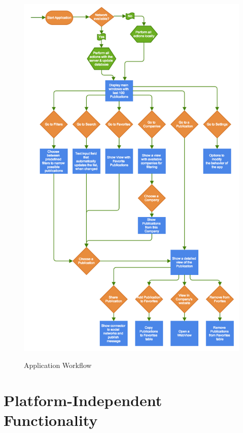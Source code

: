 \begin{figure}
    \begin{center}
        {\includegraphics[width=1.14\linewidth]{gfx/app_flow}}
        \caption[Application Workflow]{Application Workflow}\label{fig:app_flow}
    \end{center}
\end{figure}



\section{Platform-Independent Functionality}

